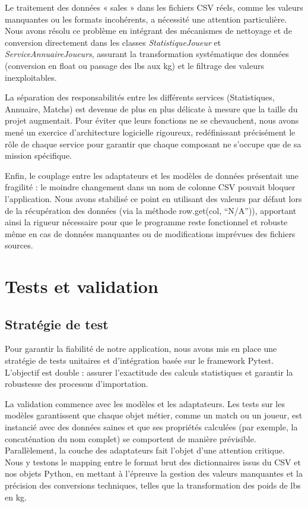 \documentclass[
  french,
  letterpaper,
  DIV=11,
  numbers=noendperiod]{scrartcl}
\begin{document}
Le traitement des données « sales » dans les fichiers CSV réels, comme
les valeurs manquantes ou les formats incohérents, a nécessité une
attention particulière. Nous avons résolu ce problème en intégrant des
mécanismes de nettoyage et de conversion directement dans les classes
\emph{StatistiqueJoueur} et \emph{ServiceAnnuaireJoueurs}, assurant la
transformation systématique des données (conversion en float ou passage
des lbs aux kg) et le filtrage des valeurs inexploitables.

La séparation des responsabilités entre les différents services
(Statistiques, Annuaire, Matchs) est devenue de plus en plus délicate à
mesure que la taille du projet augmentait. Pour éviter que leurs
fonctions ne se chevauchent, nous avons mené un exercice d'architecture
logicielle rigoureux, redéfinissant précisément le rôle de chaque
service pour garantir que chaque composant ne s'occupe que de sa mission
spécifique.

Enfin, le couplage entre les adaptateurs et les modèles de données
présentait une fragilité : le moindre changement dans un nom de colonne
CSV pouvait bloquer l'application. Nous avons stabilisé ce point en
utilisant des valeurs par défaut lors de la récupération des données
(via la méthode row.get(col, ``N/A'')), apportant ainsi la rigueur
nécessaire pour que le programme reste fonctionnel et robuste même en
cas de données manquantes ou de modifications imprévues des fichiers
sources.

\newpage

\section{Tests et validation}\label{tests-et-validation}

\subsection{Stratégie de test}\label{stratuxe9gie-de-test}

Pour garantir la fiabilité de notre application, nous avons mis en place
une stratégie de tests unitaires et d'intégration basée sur le framework
Pytest. L'objectif est double : assurer l'exactitude des calculs
statistiques et garantir la robustesse des processus d'importation.

La validation commence avec les modèles et les adaptateurs. Les tests
sur les modèles garantissent que chaque objet métier, comme un match ou
un joueur, est instancié avec des données saines et que ses propriétés
calculées (par exemple, la concaténation du nom complet) se comportent
de manière prévisible. Parallèlement, la couche des adaptateurs fait
l'objet d'une attention critique. Nous y testons le mapping entre le
format brut des dictionnaires issus du CSV et nos objets Python, en
mettant à l'épreuve la gestion des valeurs manquantes et la précision
des conversions techniques, telles que la transformation des poids de
lbs en kg.
\end{document}
